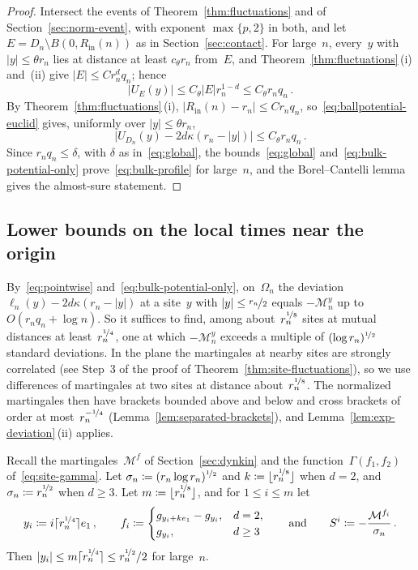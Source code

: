 \documentclass[11pt]{amsart}
\theoremstyle{plain}
\theoremstyle{definition}
\newcommand{\drift}{\kappa}
\newcommand{\nf}{\nicefrac}
\newcommand{\Rin}{R_{\mathrm{in}}}
\numberwithin{equation}{section}
\begin{document}
\begin{proof}
Intersect the events of Theorem~\ref{thm:fluctuations} and of Section~\ref{sec:norm-event}, with exponent $\max\{p,2\}$ in both, and let $E=D_n\setminus B(0,\Rin(n))$ as in Section~\ref{sec:contact}. For large~$n$, every~$y$ with $|y|\leq\theta r_n$ lies at distance at least $c_\theta r_n$ from~$E$, and Theorem~\ref{thm:fluctuations}\,(i) and~(ii) give $|E|\leq Cr_n^dq_n$; hence
\begin{equation*}
|U_E(y)|\leq C_\theta|E|r_n^{1-d}\leq C_\theta r_nq_n\, .
\end{equation*}
By Theorem~\ref{thm:fluctuations}\,(i), $|\Rin(n)-r_n|\leq Cr_nq_n$, so~\eqref{eq:ballpotential-euclid} gives, uniformly over $|y|\leq\theta r_n$,
\begin{equation}\label{eq:bulk-potential-only}
\bigl|U_{D_n}(y)-2d\drift(r_n-|y|)\bigr|\leq C_\theta r_nq_n\, .
\end{equation}
Since $r_nq_n\leq\delta$, with $\delta$ as in~\eqref{eq:global}, the bounds~\eqref{eq:global} and~\eqref{eq:bulk-potential-only} prove~\eqref{eq:bulk-profile} for large~$n$, and the Borel--Cantelli lemma gives the almost-sure statement.
\end{proof}

\subsection{Lower bounds on the local times near the origin}\label{sec:sharp-bulk}

By~\eqref{eq:pointwise} and~\eqref{eq:bulk-potential-only}, on~$\Omega_n$ the deviation $\ell_n(y)-2d\drift(r_n-|y|)$ at a site~$y$ with $|y|\leq\nf{r_n}{2}$ equals $-\mathcal M_n^y$ up to $O(r_nq_n+\log n)$. So it suffices to find, among about~$r_n^{\nf18}$ sites at mutual distances at least~$r_n^{\nf14}$, one at which $-\mathcal M_n^y$ exceeds a multiple of $(\log r_n)^{\nf12}$ standard deviations. In the plane the martingales at nearby sites are strongly correlated (see Step~3 of the proof of Theorem~\ref{thm:site-fluctuations}), so we use differences of martingales at two sites at distance about~$r_n^{\nf18}$. The normalized martingales then have brackets bounded above and below and cross brackets of order at most~$r_n^{-\nf14}$ (Lemma~\ref{lem:separated-brackets}), and Lemma~\ref{lem:exp-deviation}\,(ii) applies.

Recall the martingales~$\mathcal M^f$ of Section~\ref{sec:dynkin} and the function~$\Gamma(f_1,f_2)$ of~\eqref{eq:site-gamma}. Let $\sigma_n\coloneqq(r_n\log r_n)^{\nf12}$ and $k\coloneqq\lfloor r_n^{\nf18}\rfloor$ when $d=2$, and $\sigma_n\coloneqq r_n^{\nf12}$ when $d\geq3$. Let $m\coloneqq\lfloor r_n^{\nf18}\rfloor$, and for $1\leq i\leq m$ let
\begin{equation*}
y_i\coloneqq i\lceil r_n^{\nf14}\rceil e_1\, ,\qquad
f_i\coloneqq\begin{cases}g_{y_i+ke_1}-g_{y_i},&d=2,\\g_{y_i},&d\geq3\end{cases}
\qquad\text{and}\qquad
S^i\coloneqq-\frac{\mathcal M^{f_i}}{\sigma_n}\, .
\end{equation*}
Then $|y_i|\leq m\lceil r_n^{\nf14}\rceil\leq r_n^{\nf12}/2$ for large~$n$.
\end{document}
